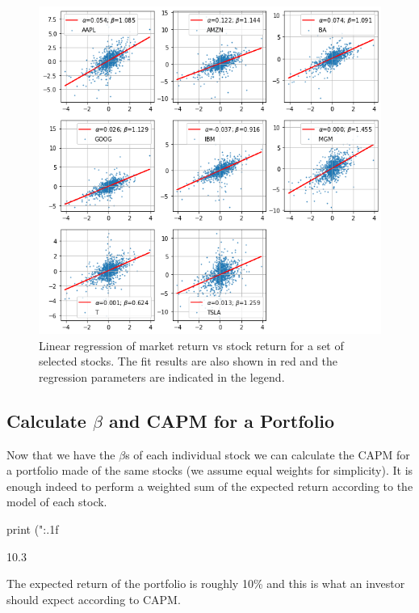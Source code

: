 \begin{figure}[htbp]
\centering
\includegraphics[width=\textwidth]{figures/capm_fit.png}
\caption{Linear regression of market return vs stock return for a set of selected stocks. The fit results are also shown in red and the regression parameters are indicated in the legend.}
\label{fig:capm_fit}
\end{figure}

\subsection{Calculate $\beta$ and CAPM for a Portfolio}

Now that we have the $\beta$s of each individual stock we can calculate the CAPM for a portfolio made of the same stocks (we assume equal weights for simplicity).
It is enough indeed to perform a weighted sum of the expected return according to the model of each stock.

\begin{ipython}
print ("{:.1f}%
\end{ipython}
\begin{ioutput}
10.3%
\end{ioutput}

The expected return of the portfolio is roughly 10\% and this is what an investor should expect according to CAPM.

